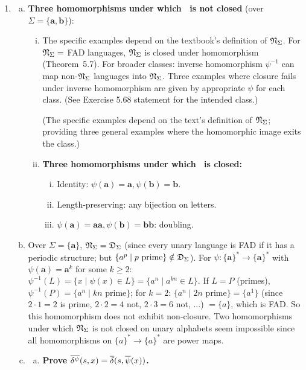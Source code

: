 \begin{enumerate}[{5.}1. ]
\item \begin{enumerate}[(a)]
  \item \textbf{Three homomorphisms under which \NSIG\ is not closed} (over $\Sigma=\{\pmb{a},\pmb{b}\}$):
  \begin{enumerate}[(i)]
    \item The specific examples depend on the textbook's definition of $\mathfrak{N}_\Sigma$. For $\mathfrak{N}_\Sigma=$ FAD languages, $\mathfrak{N}_\Sigma$ is closed under homomorphism (Theorem~5.7). For broader classes: inverse homomorphism $\psi^{-1}$ can map non-$\mathfrak{N}_\Sigma$ languages into $\mathfrak{N}_\Sigma$. Three examples where closure fails under inverse homomorphism are given by appropriate $\psi$ for each class. (See Exercise 5.68 statement for the intended class.)

  (The specific examples depend on the text's definition of $\mathfrak{N}_\Sigma$; providing three general examples where the homomorphic image exits the class.)

  \item \textbf{Three homomorphisms under which \NSIG\ is closed:}
  \begin{enumerate}[(i)]
    \item Identity: $\psi(\pmb{a})=\pmb{a},\psi(\pmb{b})=\pmb{b}$.
    \item Length-preserving: any bijection on letters.
    \item $\psi(\pmb{a})=\pmb{aa},\psi(\pmb{b})=\pmb{bb}$: doubling.
  \end{enumerate}
\end{enumerate}

\item Over $\Sigma=\{\pmb{a}\}$, $\mathfrak{N}_\Sigma=\mathfrak{D}_\Sigma$ (since every unary language is FAD if it has a periodic structure; but $\{a^{p}\mid p\text{ prime}\}\notin\mathfrak{D}_\Sigma$).  For $\psi:\{\pmb{a}\}^*\to\{\pmb{a}\}^*$ with $\psi(\pmb{a})=\pmb{a}^k$ for some $k\ge 2$: $\psi^{-1}(L)=\{x\mid\psi(x)\in L\}=\{a^n\mid a^{kn}\in L\}$.  If $L=P$ (primes), $\psi^{-1}(P)=\{a^n\mid kn\text{ prime}\}$; for $k=2$: $\{a^n\mid 2n\text{ prime}\}=\{a^1\}$ (since $2\cdot 1=2$ is prime, $2\cdot 2=4$ not, $2\cdot 3=6$ not, ...) $=\{a\}$, which is FAD.  So this homomorphism does not exhibit non-closure.  Two homomorphisms under which $\mathfrak{N}_\Sigma$ is not closed on unary alphabets seem impossible since all homomorphisms on $\{a\}^*\to\{a\}^*$ are power maps.

\item \begin{enumerate}[(a)]
  \item \textbf{Prove $\overline{\delta^\psi}(s,x)=\overline{\delta}(s,\overline{\psi}(x))$.}


\end{enumerate}
\end{enumerate}
\end{enumerate}

